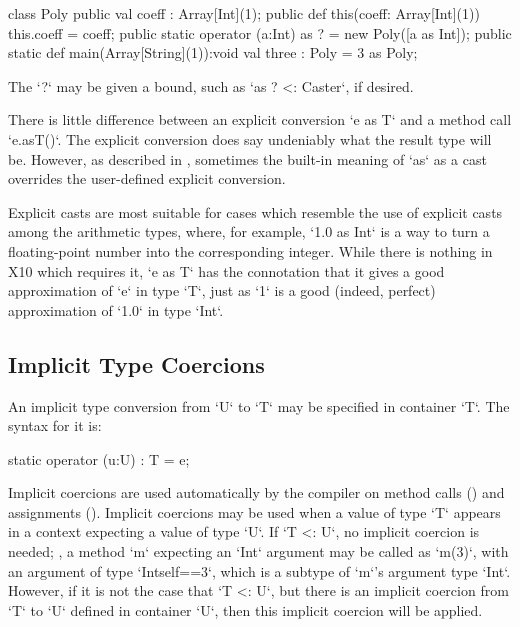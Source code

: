 \begin{ex}
\begin{xten}
class Poly {
  public val coeff : Array[Int](1);
  public def this(coeff: Array[Int](1)) { this.coeff = coeff;}
  public static operator (a:Int) as ? = new Poly([a as Int]);
  public static def main(Array[String](1)):void {
     val three : Poly = 3 as Poly;
  }
}
\end{xten}
%
\end{ex}
The \xcd`?` may be given a bound, such as \xcd`as ? <: Caster`, if desired.
  

There is little difference between an explicit conversion \xcd`e as T` and a
method call \xcd`e.asT()`.  The explicit conversion does say undeniably what
the result type will be.  However, as described in ,
sometimes the built-in meaning of \xcd`as` as a cast overrides the
user-defined explicit conversion.  

Explicit casts are most suitable for cases
which resemble the use of explicit casts among the arithmetic types, where, 
for example, \xcd`1.0 as Int` is a way to turn a floating-point number into the
corresponding integer.  
While there is nothing in X10 which
requires it, \xcd`e as T` has the connotation that it gives a good
approximation of \xcd`e` in type \xcd`T`, just as \xcd`1` is a good
(indeed, perfect) approximation of \xcd`1.0` in type \xcd`Int`.  

\subsection{Implicit Type Coercions}
\label{sect:ImplicitCoercion}

An implicit type conversion from \xcd`U`  to \xcd`T` may be specified in
container \xcd`T`.  
The syntax for it is: 
\begin{xten}
static operator (u:U) : T = e;
\end{xten}



Implicit coercions are used automatically by the compiler on method calls 
() and assignments ().
Implicit coercions may be used when a value of type \xcd`T` appears in a
context expecting a value of type \xcd`U`.  If \xcd`T <: U`, no implicit
coercion is needed; \eg, a method \xcd`m` expecting an \xcd`Int` argument may 
be called as \xcd`m(3)`, with an argument of type \xcd`Int{self==3}`, which is
a subtype of \xcd`m`'s argument type \xcd`Int`. 
However, if it is not the case that \xcd`T <: U`, but there is an implicit
coercion from \xcd`T` to \xcd`U` defined in container \xcd`U`, then this
implicit coercion will be applied.

